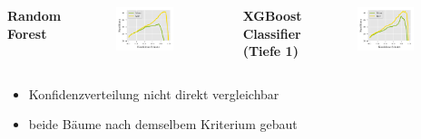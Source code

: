 \documentclass[aspectratio=1610, professionalfonts, 9pt]{beamer}
\begin{document}
\begin{frame}
  \begin{columns}[onlytextwidth]
	\Large \bf Random Forest
	\begin{figure}
	  \centering
	  \includegraphics[width=0.8\textwidth]{./Plots/sig_mess_tree.pdf}
	\end{figure}
	\Large \bf XGBoost Classifier (Tiefe 1)
	\begin{figure}
	  \centering
	  \includegraphics[width=0.8\textwidth]{./Plots/sig_mess_xgbc.pdf}
	\end{figure}
  \end{columns}
  \begin{itemize}
	\item Konfidenzverteilung nicht direkt vergleichbar
	\item beide Bäume nach demselbem Kriterium gebaut
  \end{itemize}
\end{frame}
\end{document}
